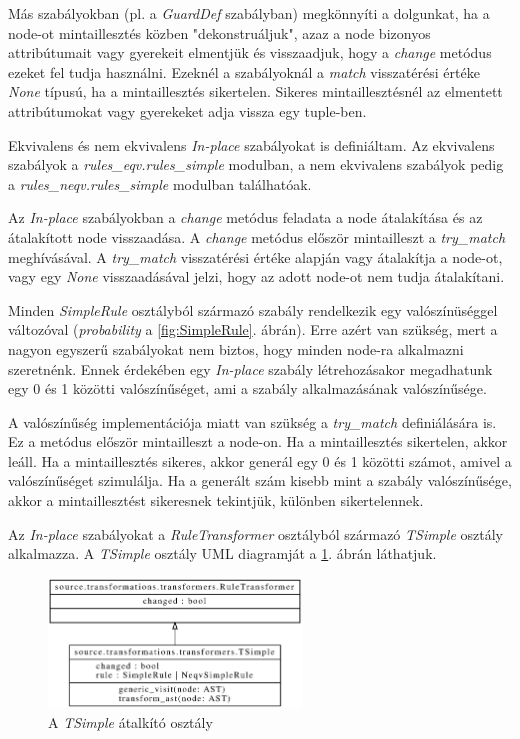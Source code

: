 Más szabályokban (pl. a \emph{GuardDef} szabályban) megkönnyíti a dolgunkat,
ha a node-ot mintaillesztés közben "dekonstruáljuk", 
azaz a node bizonyos attribútumait vagy gyerekeit elmentjük és visszaadjuk,
hogy a \emph{change} metódus ezeket fel tudja használni.
Ezeknél a szabályoknál a \emph{match} visszatérési értéke \emph{None} típusú,
ha a mintaillesztés sikertelen.
Sikeres mintaillesztésnél az elmentett attribútumokat vagy gyerekeket adja vissza
egy tuple-ben.

Ekvivalens és nem ekvivalens \emph{In-place} szabályokat is definiáltam.
Az ekvivalens szabályok
a \emph{rules\_eqv.rules\_simple} modulban,
a nem ekvivalens szabályok pedig
a \emph{rules\_neqv.rules\_simple} modulban
találhatóak.

Az \emph{In-place} szabályokban a \emph{change} metódus feladata a node átalakítása
és az átalakított node visszaadása.
A \emph{change} metódus először mintailleszt a \emph{try\_match} meghívásával.
A \emph{try\_match} visszatérési értéke alapján vagy átalakítja a node-ot,
vagy egy \emph{None} visszaadásával jelzi, hogy az adott node-ot nem tudja átalakítani.

Minden \emph{SimpleRule} osztályból származó szabály rendelkezik egy valószínüséggel változóval
(\emph{probability} a \ref{fig:SimpleRule}. ábrán).
Erre azért van szükség, mert a nagyon egyszerű szabályokat nem biztos,
hogy minden node-ra alkalmazni szeretnénk.
Ennek érdekében egy \emph{In-place} szabály létrehozásakor megadhatunk
egy 0 és 1 közötti valószínűséget, ami a szabály alkalmazásának valószínűsége.

A valószínűség implementációja miatt van szükség a \emph{try\_match} definiálására is.
Ez a metódus először mintailleszt a node-on.
Ha a mintaillesztés sikertelen, akkor leáll.
Ha a mintaillesztés sikeres,
akkor generál egy 0 és 1 közötti számot,
amivel a valószínűséget szimulálja.
Ha a generált szám kisebb mint a szabály valószínűsége,
akkor a mintaillesztést sikeresnek tekintjük, különben sikertelennek.

Az \emph{In-place} szabályokat
a \emph{RuleTransformer} osztályból származó \emph{TSimple} osztály alkalmazza.
A \emph{TSimple} osztály UML diagramját a \ref{fig:TSimple}. ábrán láthatjuk.

\begin{figure}[H]
	\centering
	\includegraphics[width=0.6\textwidth]{images/uml/TSimple.eps}
	\caption{A \emph{TSimple} átalkító osztály}
	\label{fig:TSimple}
\end{figure}

